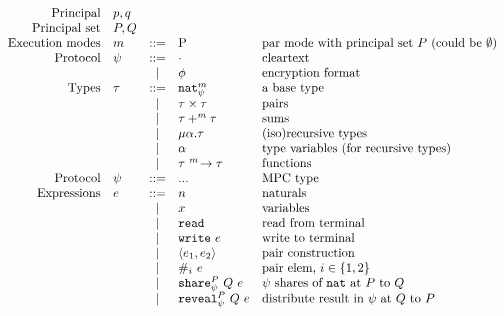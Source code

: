 \documentclass[10pt]{article}
\newcommand{\kw}[1]{\ensuremath{\mathtt{#1}}}
\newcommand{\tnat}{\ensuremath{\mathtt{nat}}}
\newcommand{\tfun}[3]{\ensuremath{{#1} ~^{#3}\!\rightarrow {#2}}}
\newcommand{\tprod}[2]{\ensuremath{{#1} \times {#2}}}
\newcommand{\tsum}[3]{\ensuremath{{#1} +^{#3} {#2}}}
\newcommand{\trec}[2]{\ensuremath{\mu {#1}.{#2}}}
\newcommand{\ereveal}[4]{\ensuremath{\kw{reveal}^{#1}_{#4}~{#2}~{#3}}}
\newcommand{\eshare}[4]{\ensuremath{\kw{share}^{#2}_{#1}~{#3}~{#4}}}
\newcommand{\eread}{\ensuremath{\kw{read}}}
\newcommand{\ewrite}[1]{\ensuremath{\kw{write}~{#1}}}
\newcommand{\epair}[2]{\ensuremath{\langle {#1}, {#2} \rangle}}
\newcommand{\eproj}[2]{\ensuremath{\kw{\#}}_{#1}~{#2}}
\begin{document}
\begin{figure}[h]
  \centering
  \[\begin{array}{rlcll}
      \text{Principal} & p, q \\
      \text{Principal set} & P, Q \\
    \text{Execution modes} & m  & ::=  & $P$ & \text{par mode with principal set $P$ (could be $\emptyset$)} \\
      \text{Protocol} & \psi & ::= & \cdot & \text{cleartext} \\
                       && \mid & \phi & \text{encryption format} \\
      \text{Types} & \tau & ::=  & \tnat^m_\psi & \text{a base type} \\
                       && \mid & \tprod{\tau}{\tau} & \text{pairs} \\
                       && \mid & \tsum{\tau}{\tau}{m} & \text{sums} \\
                       && \mid & \trec{\alpha}{\tau} & \text{(iso)recursive types} \\
                       && \mid & \alpha & \text{type variables (for recursive types)} \\
                       && \mid & \tfun{\tau}{\tau}{m} & \text{functions} \\
      \text{Protocol} & \psi & ::= & ... & \text{MPC type} \\
      \text{Expressions} & e & ::= & n & \text{naturals} \\
                       && \mid & x & \text{variables} \\
                       && \mid & \eread & \text{read from terminal}\\
                       && \mid & \ewrite{e} & \text{write to terminal}\\
                       && \mid & \epair{e_1}{e_2} & \text{pair construction}\\
                       && \mid & \eproj{i}{e} & \text{pair elem, }i \in \{1,2\}\\
                       && \mid & \eshare{\psi}{P}{Q}{e} & \text{$\psi$ shares of {\tnat} at $P$ to $Q$} \\
                       && \mid & \ereveal{P}{Q}{e}{\psi} & \text{distribute result in $\psi$ at $Q$ to $P$}\\

\end{array}\]
\end{figure}
\end{document}
